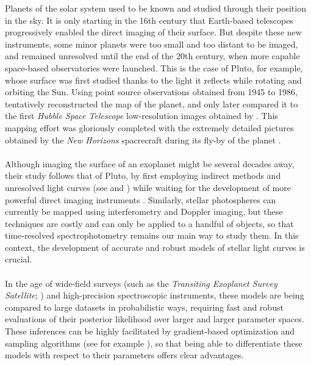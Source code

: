 \documentclass[modern]{aastex631}
\begin{document}
Planets of the solar system used to be known and studied through their position in the sky. It is only starting in the 16th century that Earth-based telescopes progressively enabled the direct imaging of their surface. But despite these new instruments, some minor planets were too small and too distant to be imaged, and remained unresolved until the end of the 20th century, when more capable space-based observatories were launched. This is the case of Pluto, for example, whose surface was first studied thanks to the light it reflects while rotating and orbiting the Sun. Using point source observations obtained from 1945 to 1986, \cite{Drish1995} tentatively reconstructed the map of the planet, and only later compared it to the first \textit{Hubble Space Telescope} low-resolution images obtained by \cite{Stern1997}. This mapping effort was gloriously completed with the extremely detailed pictures obtained by the \textit{New Horizons} spacrecraft during its fly-by of the planet \citep{Stern2015}.\\\\
Although imaging the surface of an exoplanet might be several decades away, their study follows that of Pluto, by first employing indirect methods and unresolved light curves (see \citealt{Mayor1995} and \citealt{Charbonneau2000})  while waiting for the development of more powerful direct imaging instruments \cite{}. Similarly, stellar photospheres can currently be mapped using interferometry and Doppler imaging, but these techniques are costly and can only be applied to a handful of objects, so that time-resolved spectrophotometry remains our main way to study them. In this context, the development of accurate and robust models of stellar light curves is crucial.\\\\
In the age of wide-field surveys (such as the \textit{Transiting Exoplanet Survey Satellite}; \citealt{tess}) and high-precision spectroscopic instruments, these models are being compared to large datasets in probabilistic ways, requiring fast and robust evaluations of their posterior likelihood over larger and larger parameter spaces. These inferences can be highly facilitated by gradient-based optimization and sampling algorithms (see for example \citealt{Betancourt2017}), so that being able to differentiate these models with respect to their parameters offers clear advantages.\\\\
\end{document}
